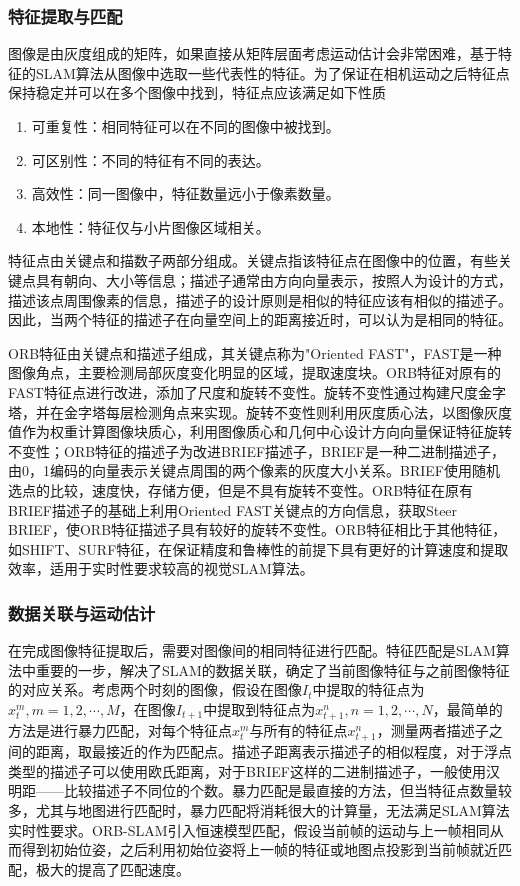 \subsubsection*{特征提取与匹配}
图像是由灰度组成的矩阵，如果直接从矩阵层面考虑运动估计会非常困难，基于特征的SLAM算法从图像中选取一些代表性的特征。为了保证在相机运动之后特征点保持稳定并可以在多个图像中找到，特征点应该满足如下性质
\begin{enumerate}[label={(\arabic*)}]
\item 可重复性：相同特征可以在不同的图像中被找到。
\item 可区别性：不同的特征有不同的表达。
\item 高效性：同一图像中，特征数量远小于像素数量。
\item 本地性：特征仅与小片图像区域相关。
\end{enumerate}

特征点由关键点和描数子两部分组成。关键点指该特征点在图像中的位置，有些关键点具有朝向、大小等信息；描述子通常由方向向量表示，按照人为设计的方式，描述该点周围像素的信息，描述子的设计原则是相似的特征应该有相似的描述子。因此，当两个特征的描述子在向量空间上的距离接近时，可以认为是相同的特征。

ORB特征由关键点和描述子组成，其关键点称为"Oriented FAST"，FAST是一种图像角点\upcite{[3.10]}，主要检测局部灰度变化明显的区域，提取速度块。ORB特征对原有的FAST特征点进行改进，添加了尺度和旋转不变性。旋转不变性通过构建尺度金字塔，并在金字塔每层检测角点来实现。旋转不变性则利用灰度质心法，以图像灰度值作为权重计算图像块质心，利用图像质心和几何中心设计方向向量保证特征旋转不变性；ORB特征的描述子为改进BRIEF描述子，BRIEF是一种二进制描述子\upcite{[3.11]}，由0，1编码的向量表示关键点周围的两个像素的灰度大小关系。BRIEF使用随机选点的比较，速度快，存储方便，但是不具有旋转不变性。ORB特征在原有BRIEF描述子的基础上利用Oriented FAST关键点的方向信息，获取Steer BRIEF，使ORB特征描述子具有较好的旋转不变性。ORB特征相比于其他特征，如SHIFT、SURF特征，在保证精度和鲁棒性的前提下具有更好的计算速度和提取效率，适用于实时性要求较高的视觉SLAM算法。

\subsubsection*{数据关联与运动估计}
在完成图像特征提取后，需要对图像间的相同特征进行匹配。特征匹配是SLAM算法中重要的一步，解决了SLAM的数据关联，确定了当前图像特征与之前图像特征的对应关系。考虑两个时刻的图像，假设在图像$I_t$中提取的特征点为$x_t^m,m=1,2,\cdots,M$，在图像$I_{t+1}$中提取到特征点为$x_{t+1}^n,n=1,2,\cdots,N$，最简单的方法是进行暴力匹配，对每个特征点$x_t^m$与所有的特征点$x_{t+1}^n$，测量两者描述子之间的距离，取最接近的作为匹配点。描述子距离表示描述子的相似程度，对于浮点类型的描述子可以使用欧氏距离，对于BRIEF这样的二进制描述子，一般使用汉明距——比较描述子不同位的个数。暴力匹配是最直接的方法，但当特征点数量较多，尤其与地图进行匹配时，暴力匹配将消耗很大的计算量，无法满足SLAM算法实时性要求。ORB-SLAM引入恒速模型匹配，假设当前帧的运动与上一帧相同从而得到初始位姿，之后利用初始位姿将上一帧的特征或地图点投影到当前帧就近匹配，极大的提高了匹配速度。

